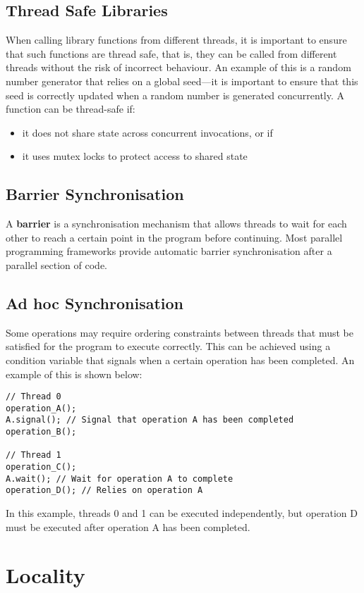 \documentclass{article}
\begin{document}
\subsection{Thread Safe Libraries}
When calling library functions from different threads, it is important
to ensure that such functions are thread safe, that is, they can be
called from different threads without the risk of incorrect behaviour.
An example of this is a random number generator that relies on a global
seed---it is important to ensure that this seed is correctly updated
when a random number is generated concurrently. A function can be
thread-safe if:
\begin{itemize}
    \item it does not share state across concurrent invocations, or if
    \item it uses mutex locks to protect access to shared state
\end{itemize}
\subsection{Barrier Synchronisation}
A \textbf{barrier} is a synchronisation mechanism that allows threads
to wait for each other to reach a certain point in the program before
continuing. Most parallel programming frameworks provide automatic
barrier synchronisation after a parallel section of code.
\subsection{Ad hoc Synchronisation}
Some operations may require ordering constraints between threads that
must be satisfied for the program to execute correctly. This can be
achieved using a condition variable that signals when a certain
operation has been completed. An example of this is shown below:
\begin{verbatim}
// Thread 0
operation_A();
A.signal(); // Signal that operation A has been completed
operation_B();

// Thread 1
operation_C();
A.wait(); // Wait for operation A to complete
operation_D(); // Relies on operation A
\end{verbatim}
In this example, threads 0 and 1 can be executed independently, but
operation D must be executed after operation A has been completed.
\section{Locality}
\end{document}

